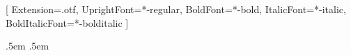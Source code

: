 \usepackage{amsmath,amsthm}
\usepackage{tikz}

\usepackage{fontspec,unicode-math}
\setmainfont{texgyrepagella}[
  Extension=.otf,
  UprightFont=*-regular,
  BoldFont=*-bold,
  ItalicFont=*-italic,
  BoldItalicFont=*-bolditalic
]

\setlength{\textwidth}{390pt}
\setlength{\oddsidemargin}{\dimexpr(\paperwidth-\textwidth)/2-1in\relax}
\setlength{\evensidemargin}{\oddsidemargin}
\setlength{\emergencystretch}{3em}


\makeatletter
\renewcommand{\@openbib@code}{%
  \setlength{\itemindent}{\leftmargin}%
  \setlength{\leftmargin}{0pt}%
}
\makeatother

\newcommand{\MM}{\overline{\mathcal{M}}}
\newcommand{\EE}{\mathbb{E}}
\newcommand{\dd}{\mathrm{d}}

\DeclareMathOperator{\Cin}{\mathrm{Cin}}

  {\topsep}{\topsep}{\itshape}{}{\bfseries}{}{.5em}
  {}
  {\topsep}{\topsep}{\normalfont}{}{\bfseries}{}{.5em}
  {}

\theoremstyle{paperplain}
\newtheorem{thm}{Theorem}[section]
\newtheorem{dfn}[thm]{Definition}
\newtheorem{lmm}[thm]{Lemma}
\newtheorem{prp}[thm]{Proposition}
\newtheorem{crl}[thm]{Corollary}

\theoremstyle{paperremark}
\newtheorem{rmk}{Remark}[section]
\newtheorem{exm}{Example}[section]
\theoremstyle{paperplain}

\newenvironment{prf}{\noindent \textbf{Proof: }}{\hfill $\mdlgwhtsquare$\par\addvspace{0.5\baselineskip}}
\newenvironment{prfn}[1]{\vskip 1em \noindent \textbf{Proof of #1: }}{\hfill $\mdlgwhtsquare$\par\addvspace{0.5\baselineskip}}
